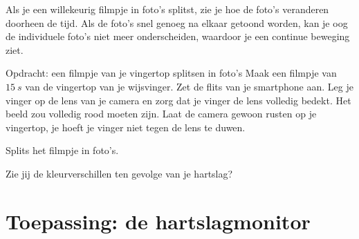 Als je een willekeurig filmpje in foto's splitst, zie je hoe de foto's veranderen doorheen de tijd. Als de foto's snel genoeg na elkaar getoond worden, kan je oog de individuele foto's niet meer onderscheiden, waardoor je een continue beweging ziet.

\begin{opdracht}{Opdracht: een filmpje van je vingertop splitsen in foto's}
	Maak een filmpje van $15~s$ van de vingertop van je wijsvinger. Zet de flits van je smartphone aan. Leg je vinger op de lens van je camera en zorg dat je vinger de lens volledig bedekt. Het beeld zou volledig rood moeten zijn. Laat de camera gewoon rusten op je vingertop, je hoeft je vinger niet tegen de lens te duwen. 
	
	Splits het filmpje in foto's. 
	
	Zie jij de kleurverschillen ten gevolge van je hartslag?
\end{opdracht}


\section{Toepassing: de hartslagmonitor}
\label{sec:Mod3_Sec3}
%

